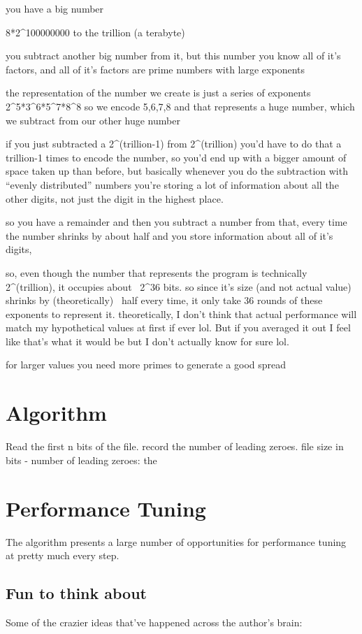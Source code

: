 \documentclass[12pt]{article}
\begin{document}
you have a big number

8*2^100000000 to the trillion (a terabyte)

you subtract another big number from it,
but this number you know all of it's factors, and all of it's factors are prime numbers with large exponents

the representation of the number we create is just a series of exponents
2^5*3^6*5^7*8^8
so we encode 5,6,7,8
and that represents a huge number, which we subtract from our other huge number

if you just subtracted a 2^(trillion-1) from 2^(trillion) you'd have to do that a trillion-1 times to encode the number, so you'd end up with a bigger amount of space taken up than before,
but basically whenever you do the subtraction with ``evenly distributed'' numbers you're storing a lot of information about all the other digits, not just the digit in the highest place.

so you have a remainder and then you subtract a number from that, every time the number shrinks by about half
and you store information about all of it's digits,

so, even though the number that represents the program is technically 2^(trillion), it occupies about ~2^36
bits. so since it's size (and not actual value) shrinks by (theoretically) ~half every time, it only take 36 rounds of these exponents to represent it. theoretically, I don't think that actual performance will match my hypothetical values at first if ever lol. But if you averaged it out I feel like that's what it would be but I don't actually know for sure lol.

for larger values you need more primes to generate a good spread
\section{Algorithm}
Read the first n bits of the file.
record the number of leading zeroes.
file size in bits - number of leading zeroes:
the 
\section{Performance Tuning}
The algorithm presents a large number of opportunities for performance tuning at pretty much
every step.

\subsection{Fun to think about}
Some of the crazier ideas that've happened across the author's brain:
\end{document}
